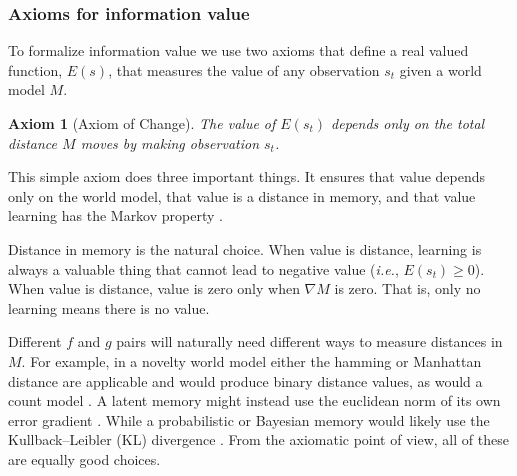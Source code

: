 \documentclass[fleqn,10pt]{wlscirep}
\newtheorem{axiom}{Axiom}
\begin{document}


\subsubsection*{Axioms for information value}
To formalize information value we use two axioms that define a real valued function, $E(s)$, that measures the value of any observation $s_t$ given a world model $M$.

\begin{axiom}
    [Axiom of Change] The value of $E(s_t)$ depends only on the total distance $M$ moves by making observation $s_t$.
\label{ax:4} \end{axiom}

\noindent This simple axiom does three important things. It ensures that value depends only on the world model, that value is a distance in memory, and that value learning has the Markov property \cite{Sutton2018}. 

Distance in memory is the natural choice. When value is distance, learning is always a valuable thing that cannot lead to negative value (\textit{i.e.}, $E(s_t) \ge 0$). When value is distance, value is zero only when $\nabla M$ is zero. That is, only no learning means there is no value. 

Different $f$ and $g$ pairs will naturally need different ways to measure distances in $M$. For example, in a novelty world model \cite{Kakade2002} either the hamming or Manhattan distance are applicable and would produce binary distance values, as would a count model \cite{Bellemare2016,Dayan1993}. A latent memory \cite{Schmidhuber1991,Pathak2017} might instead use the euclidean norm of its own error gradient \cite{Pascanu2013}. While a probabilistic or Bayesian memory would likely use the Kullback–Leibler (KL) divergence \cite{Park2017,Friston2016}.  From the axiomatic point of view, all of these are equally good choices.
 
\end{document}
